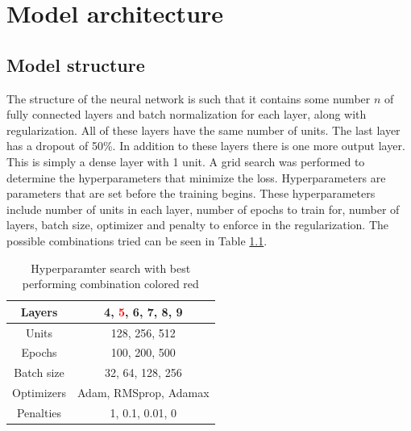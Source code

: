 
\chapter{Model architecture} %

\label{Chapter4} %


\section{Model structure}
The structure of the neural network is such that it contains some number $n$ of fully connected layers and batch normalization for each layer, along with regularization. All of these layers have the same number of units. The last layer has a dropout of 50\%. In addition to these layers there is one more output layer. This is simply a dense layer with 1 unit. A grid search was performed to determine the hyperparameters that minimize the loss. Hyperparameters are parameters that are set before the training begins\cite{hyperparameters_definition}. These hyperparameters include number of units in each layer, number of epochs to train for, number of layers, batch size, optimizer and penalty to enforce in the regularization. The possible combinations tried can be seen in Table \ref{table:gridSearchHyperparamters}.

\begin{table}[h]
    \centering
    \caption{Hyperparamter search with best performing combination colored red}
    \label{table:gridSearchHyperparamters}
    \begin{tabular}{c|c}
        Layers &  4, \textcolor{red}{5}, 6, 7, 8, 9\\\hline
        Units &  128, 256, 512\\\hline
        Epochs & 100, 200, 500\\\hline
        Batch size & 32, 64, 128, 256\\\hline
        Optimizers & Adam, RMSprop, Adamax\\\hline
        Penalties & 1, 0.1, 0.01, 0\\\hline
    \end{tabular}
\end{table}

